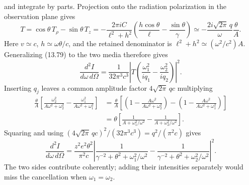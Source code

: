 and integrate by parts. Projection onto the radiation polarization
in the observation plane gives
\[
T=\cos\theta\,T_\rho-\sin\theta\,T_z
=-\frac{2\pi i C}{\ell^2+h^2}
 \left(\frac{h\cos\theta}{\ell}-\frac{\sin\theta}{\gamma}\right)
\simeq-\frac{2i\sqrt{2\pi}\,q}{\omega}\frac{\theta}{A}.
\]
Here $v\simeq c$, $h\simeq\omega\theta/c$, and the retained denominator
is $\ell^2+h^2\simeq(\omega^2/c^2)A$.
Generalizing (13.79) to the two media therefore gives
\[
\frac{d^2I}{d\omega\,d\Omega}
=\frac1{32\pi^3c^3}
 \left|T\left(\frac{\omega_1^2}{iq_1}
                   -\frac{\omega_2^2}{iq_2}\right)\right|^2.
\]
Inserting $q_j$ leaves a common amplitude factor
$4\sqrt{2\pi}\,qc$ multiplying
\[
 \begin{split}
 \frac{\theta}{A}
 \left[\frac{\omega_2^2}{A\omega^2+\omega_2^2}
       -\frac{\omega_1^2}{A\omega^2+\omega_1^2}\right]
 &=\frac{\theta}{A}
 \left[\left(1-\frac{A\omega^2}{A\omega^2+\omega_2^2}\right)
       -\left(1-\frac{A\omega^2}{A\omega^2+\omega_1^2}\right)\right]\\
 &=\theta\left[
 \frac1{A+\omega_1^2/\omega^2}
 -\frac1{A+\omega_2^2/\omega^2}\right].
 \end{split}
\]
Squaring and using
$(4\sqrt{2\pi}\,qc)^2/(32\pi^3c^3)=q^2/(\pi^2c)$ gives
\[
 \boxed{\frac{d^2I}{d\omega\,d\Omega}
 =\frac{z^2e^2\theta^2}{\pi^2c}
 \left|\frac1{\gamma^{-2}+\theta^2+\omega_1^2/\omega^2}
       -\frac1{\gamma^{-2}+\theta^2+\omega_2^2/\omega^2}\right|^2.}
\]
The two sides contribute coherently; adding their intensities separately
would miss the cancellation when $\omega_1=\omega_2$.

